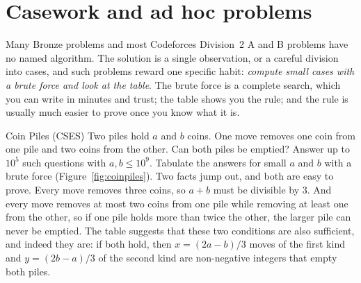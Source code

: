 \section[Casework and ad hoc problems]{Casework and ad hoc problems \hfill \bronze}\label{sec:adhoc}

Many Bronze problems and most Codeforces Division~2 A and B problems have no named algorithm. The solution is a single
observation, or a careful division into cases, and such problems reward one specific habit: \emph{compute small cases with a
brute force and look at the table}. The brute force is a complete search, which you can write in minutes and trust; the table
shows you the rule; and the rule is usually much easier to prove once you know what it is.

\begin{problem}{Coin Piles (CSES)}
Two piles hold $a$ and $b$ coins. One move removes one coin from one pile and two coins from the other. Can both piles be
emptied? Answer up to $10^5$ such questions with $a, b \le 10^9$.
\solution Tabulate the answers for small $a$ and $b$ with a brute force (Figure~\ref{fig:coinpiles}). Two facts jump out, and
both are easy to prove. Every move removes three coins, so $a + b$ must be divisible by 3. And every move removes at most two
coins from one pile while removing at least one from the other, so if one pile holds more than twice the other, the larger
pile can never be emptied. The table suggests that these two conditions are also sufficient, and indeed they are: if both
hold, then $x = (2a - b)/3$ moves of the first kind and $y = (2b - a)/3$ of the second kind are non-negative integers that
empty both piles.
\end{problem}

